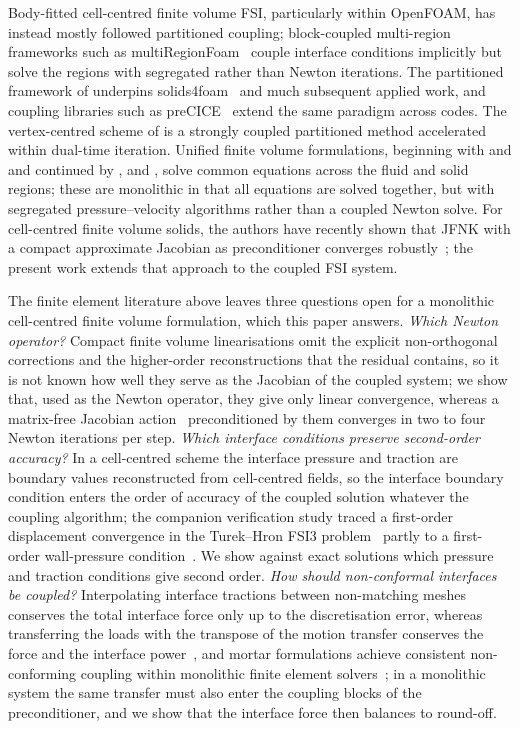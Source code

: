 Body-fitted cell-centred finite volume FSI, particularly within OpenFOAM, has instead mostly followed partitioned coupling; block-coupled multi-region frameworks such as multiRegionFoam~\citep{Alkafri2025} couple interface conditions implicitly but solve the regions with segregated rather than Newton iterations.
The partitioned framework of \citet{Tukovic2018} underpins solids4foam~\citep{Cardiff2025} and much subsequent applied work, and coupling libraries such as preCICE~\citep{bungartz2016precice} extend the same paradigm across codes.
The vertex-centred scheme of \citet{Malan2013} is a strongly coupled partitioned method accelerated within dual-time iteration.
Unified finite volume formulations, beginning with \citet{Greenshields1999b} and \citet{Greenshields2005} and continued by \citet{Papadakis2008}, \citet{Giannopapa2008} and \citet{Tandis2023}, solve common equations across the fluid and solid regions; these are monolithic in that all equations are solved together, but with segregated pressure--velocity algorithms rather than a coupled Newton solve.
For cell-centred finite volume solids, the authors have recently shown that JFNK with a compact approximate Jacobian as preconditioner converges robustly~\citep{Cardiff2026, Batistic2026}; the present work extends that approach to the coupled FSI system.

The finite element literature above leaves three questions open for a monolithic cell-centred finite volume formulation, which this paper answers.
\emph{Which Newton operator?}
Compact finite volume linearisations omit the explicit non-orthogonal corrections and the higher-order reconstructions that the residual contains, so it is not known how well they serve as the Jacobian of the coupled system; we show that, used as the Newton operator, they give only linear convergence, whereas a matrix-free Jacobian action~\citep{Knoll2004} preconditioned by them converges in two to four Newton iterations per step.
\emph{Which interface conditions preserve second-order accuracy?}
In a cell-centred scheme the interface pressure and traction are boundary values reconstructed from cell-centred fields, so the interface boundary condition enters the order of accuracy of the coupled solution whatever the coupling algorithm; the companion verification study traced a first-order displacement convergence in the Turek--Hron FSI3 problem~\citep{Turek2006} partly to a first-order wall-pressure condition~\citep{CardiffFSIVerification2026}.
We show against exact solutions which pressure and traction conditions give second order.
\emph{How should non-conformal interfaces be coupled?}
Interpolating interface tractions between non-matching meshes conserves the total interface force only up to the discretisation error, whereas transferring the loads with the transpose of the motion transfer conserves the force and the interface power~\citep{Farhat1998, deBoer2007}, and mortar formulations achieve consistent non-conforming coupling within monolithic finite element solvers~\citep{Kloppel2011}; in a monolithic system the same transfer must also enter the coupling blocks of the preconditioner, and we show that the interface force then balances to round-off.

